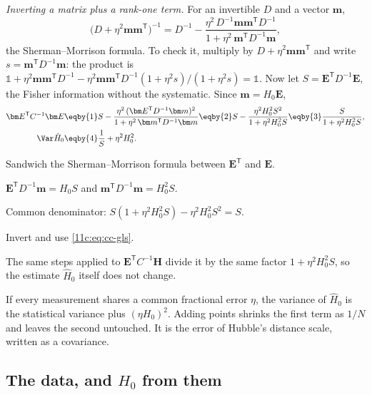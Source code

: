 \emph{Inverting a matrix plus a rank-one term.} For an invertible $D$ and a vector
$\bm m$,
\[
  \bigl(D+\eta^2\bm m\bm m^{\mathsf T}\bigr)^{-1}
  =D^{-1}-\frac{\eta^2\,D^{-1}\bm m\bm m^{\mathsf T}D^{-1}}{1+\eta^2\,\bm m^{\mathsf T}D^{-1}\bm m},
\]
the Sherman--Morrison formula. To check it, multiply by $D+\eta^2\bm m\bm m^{\mathsf T}$ and
write $s=\bm m^{\mathsf T}D^{-1}\bm m$: the product is
$\mathbb 1+\eta^2\bm m\bm m^{\mathsf T}D^{-1}-\eta^2\bm m\bm m^{\mathsf T}D^{-1}(1+\eta^2s)/(1+\eta^2s)=\mathbb 1$.
Now let $S=\bm E^{\mathsf T}D^{-1}\bm E$, the Fisher information without the systematic.
Since $\bm m=H_0\bm E$,
\begin{align}
  \bm E^{\mathsf T}C^{-1}\bm E
  &\eqby{1}S-\frac{\eta^2\,(\bm E^{\mathsf T}D^{-1}\bm m)^2}{1+\eta^2\,\bm m^{\mathsf T}D^{-1}\bm m}
   \eqby{2}S-\frac{\eta^2H_0^2S^2}{1+\eta^2H_0^2S}
   \eqby{3}\frac{S}{1+\eta^2H_0^2S},
  \nonumber\\
  \Var\hat H_0
  &\eqby{4}\frac{1}{S}+\eta^2H_0^2 .
  \label{11c:eq:cc-sys}
\end{align}
\begin{explain}
  \item Sandwich the Sherman--Morrison formula between $\bm E^{\mathsf T}$ and $\bm E$.
  \item $\bm E^{\mathsf T}D^{-1}\bm m=H_0S$ and $\bm m^{\mathsf T}D^{-1}\bm m=H_0^2S$.
  \item Common denominator: $S(1+\eta^2H_0^2S)-\eta^2H_0^2S^2=S$.
  \item Invert and use \eqref{11c:eq:cc-gls}.
\end{explain}
The same steps applied to $\bm E^{\mathsf T}C^{-1}\bm H$ divide it by the same factor
$1+\eta^2H_0^2S$, so the estimate $\hat H_0$ itself does not change.

\begin{keyidea}
If every measurement shares a common fractional error $\eta$, the variance of
$\hat H_0$ is the statistical variance plus $(\eta H_0)^2$. Adding points shrinks the
first term as $1/N$ and leaves the second untouched. It is the error of Hubble's
distance scale, written as a covariance.
\end{keyidea}

\subsection{The data, and \texorpdfstring{$H_0$}{H0} from them}
\label{11c:sec:cc-fit}

